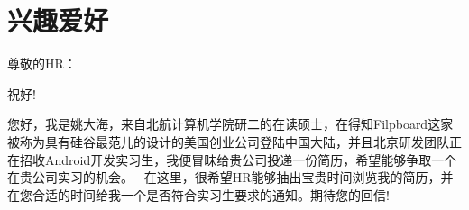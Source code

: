 \documentclass[zh,color,11pt,a4paper,sans]{moderncv} %
\begin{document}


\section{兴趣爱好}

\renewcommand{\listitemsymbol}{-~} %




\clearpage

\date{\today} %
\opening{尊敬的HR：} %
\closing{祝好!} %

\makelettertitle %

您好，我是姚大海，来自北航计算机学院研二的在读硕士，在得知Filpboard这家被称为具有硅谷最范儿的设计的美国创业公司登陆中国大陆，并且北京研发团队正在招收Android开发实习生，我便冒昧给贵公司投递一份简历，希望能够争取一个在贵公司实习的机会。
\newline{}\newline{}
~在这里，很希望HR能够抽出宝贵时间浏览我的简历，并在您合适的时间给我一个是否符合实习生要求的通知。期待您的回信!

\makeletterclosing %

\end{document}
